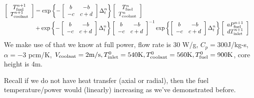 \documentclass{school-22.211-notes}
\begin{document}
\begin{align}
 \left[ \begin{array}{c} T_{\mathrm{fuel}}^{n+1} \\ T_{\mathrm{coolant}}^{n+1} \end{array} \right]
&= \exp \left\{ -  \left[ \begin{array}{cc} b & -b \\ -c & c+d \end{array} \right] \Delta_t^n \right\}
\left[ \begin{array}{c} T_{\mathrm{fuel}}^n \\ T_{\mathrm{coolant}}^n \end{array} \right] \notag \\
&+ \exp \left\{ -  \left[ \begin{array}{cc} b & -b \\ -c & c+d \end{array} \right] \Delta_t^n \right\}
\left[ \begin{array}{cc} b & -b \\ -c & c+d \end{array} \right]^{-1}
\exp \left\{ \left[ \begin{array}{cc} b & -b \\ -c & c+d \end{array} \right] \Delta_t^n \right\}
\left[ \begin{array}{c} a P_{\mathrm{fuel}}^{n+1} \\ d T_{\mathrm{inlet}}^{n+1} \end{array} \right] \label{TH-analytical}
\end{align}
We make use of that we know at full power,  flow rate is 30 W/g, $C_p = 300$J/kg-s, $\alpha = -3$ pcm/K, $V_{\mathrm{coolant}} = 2 \mathrm{m}/\mathrm{s}, T_{\mathrm{inlet}}^0 = 540 \mathrm{K}, T_{\mathrm{coolant}}^0 = 560 \mathrm{K}, T_{\mathrm{fuel}}^0 = 900 \mathrm{K}$, core height is 4m. 

Recall if we do not have heat transfer (axial or radial), then the fuel temperature/power would (linearly) increasing as we've demonstrated before. 
\end{document}
